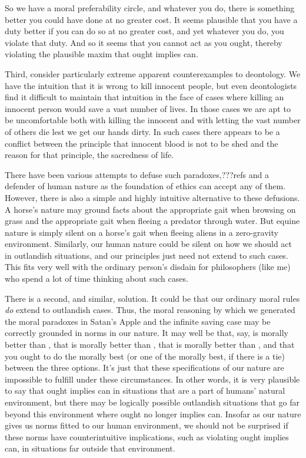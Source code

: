 So we have a moral preferability circle, and whatever you do, there is something better you could have
done at no greater cost. It seems plausible that you have a duty better if you can do so at no greater
cost, and yet whatever you do, you violate that duty. And so it seems that you cannot act as you ought,
thereby violating the plausible maxim that ought implies can.

Third, consider particularly extreme apparent counterexamples to deontology. We have the intuition that
it is wrong to kill innocent people, but even deontologists find it difficult to maintain that intuition
in the face of cases where killing an innocent person would save a vast number of lives. In those cases
we are apt to be uncomfortable  both with killing the innocent and with letting the vast number of others
die lest we get our hands dirty. In such cases there appears to be a conflict between the principle 
that innocent blood is not to be shed and the reason for that principle, the sacredness of life. 

There have been various attempts to defuse such paradoxes,???refs and a defender of human nature as the
foundation of ethics can accept any of them. However, there is also a simple and highly intuitive 
alternative to these defusions. A horse's nature may ground facts about the appropriate gait when
browsing on grass and the appropriate gait when fleeing a predator through water. But equine nature
is simply silent on a horse's gait when fleeing aliens in a zero-gravity environment. Similarly,
our human nature could be silent on how we should act in outlandish situations, and our
principles just need not extend to such cases. This fits very well with the ordinary person's
disdain for philosophers (like me) who spend a lot of time thinking about such cases. 

There is a second, and similar, solution. It could be that our ordinary moral rules \textit{do} extend to outlandish
cases. Thus, the moral reasoning by which we generated the moral paradoxes in Satan's Apple and the 
infinite saving case may be correctly grounded in norms in our nature. It may well be that, say,
 is morally better than , that  is morally better than , 
that  is morally better than , and that you ought to do the morally best (or one
of the morally best, if there is a tie) between the three options. It's just that these specifications of 
our nature are impossible to fulfill under these circumstances. In other words, it is very plausible to
say that ought implies can in situations that are a part of humans' natural environment, but there may be
logically possible outlandish situations that go far beyond this environment where ought no longer implies can. 
Insofar as our nature gives us norms fitted to our human environment, we should not be surprised if these norms
have counterintuitive implications, such as violating ought implies can, in situations far outside that environment.

